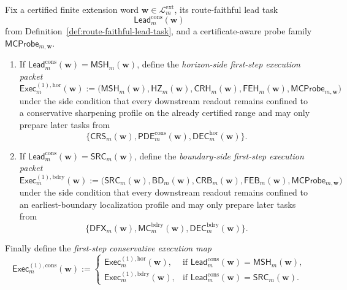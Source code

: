 \begin{definition}
\label{def:first-step-conservative-execution-packet}
Fix a certified finite extension word \(\mathbf w\in\mathcal L^{\mathrm{ext}}_{m}\), its route-faithful lead task
\[
 \mathsf{Lead}^{\mathrm{cons}}_{m}(\mathbf w)
\]
from Definition~\ref{def:route-faithful-lead-task}, and a certificate-aware probe family \(\mathsf{MCProbe}_{m,\mathbf w}\).
\begin{enumerate}[label=(\roman*)]
 \item If \(\mathsf{Lead}^{\mathrm{cons}}_{m}(\mathbf w)=\mathsf{MSH}_{m}(\mathbf w)\), define the \emph{horizon-side first-step execution packet}
 \[
 \mathsf{Exec}^{(1),\mathrm{hor}}_{m}(\mathbf w)
 :=
 \bigl(\mathsf{MSH}_{m}(\mathbf w),\mathsf{HZ}_{m}(\mathbf w),\mathsf{CRH}_{m}(\mathbf w),\mathsf{FEH}_{m}(\mathbf w),\mathsf{MCProbe}_{m,\mathbf w}\bigr)
 \]
 under the side condition that every downstream readout remains confined to a conservative sharpening profile on the already certified range and may only prepare later tasks from
 \[
 \{\mathsf{CRS}_{m}(\mathbf w),\mathsf{PDE}^{\mathrm{cons}}_{m}(\mathbf w),\mathsf{DEC}^{\mathrm{hor}}_{m}(\mathbf w)\}.
 \]
 \item If \(\mathsf{Lead}^{\mathrm{cons}}_{m}(\mathbf w)=\mathsf{SRC}_{m}(\mathbf w)\), define the \emph{boundary-side first-step execution packet}
 \[
 \mathsf{Exec}^{(1),\mathrm{bdry}}_{m}(\mathbf w)
 :=
 \bigl(\mathsf{SRC}_{m}(\mathbf w),\mathsf{BD}_{m}(\mathbf w),\mathsf{CRB}_{m}(\mathbf w),\mathsf{FEB}_{m}(\mathbf w),\mathsf{MCProbe}_{m,\mathbf w}\bigr)
 \]
 under the side condition that every downstream readout remains confined to an earliest-boundary localization profile and may only prepare later tasks from
 \[
 \{\mathsf{DFX}_{m}(\mathbf w),\mathsf{MC}^{\mathrm{bdry}}_{m}(\mathbf w),\mathsf{DEC}^{\mathrm{bdry}}_{m}(\mathbf w)\}.
 \]
\end{enumerate}
Finally define the \emph{first-step conservative execution map}
\[
 \mathsf{Exec}^{(1),\mathrm{cons}}_{m}(\mathbf w)
 :=
 \begin{cases}
 \mathsf{Exec}^{(1),\mathrm{hor}}_{m}(\mathbf w), & \text{if }\mathsf{Lead}^{\mathrm{cons}}_{m}(\mathbf w)=\mathsf{MSH}_{m}(\mathbf w),\\[2mm]
 \mathsf{Exec}^{(1),\mathrm{bdry}}_{m}(\mathbf w), & \text{if }\mathsf{Lead}^{\mathrm{cons}}_{m}(\mathbf w)=\mathsf{SRC}_{m}(\mathbf w).
 \end{cases}
\]
\end{definition}

